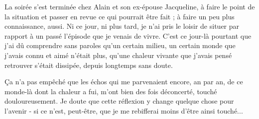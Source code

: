 La soirée s'est terminée chez Alain et son ex-épouse Jacqueline, à faire le point de la situation et passer en revue ce qui pourrait être fait ; à faire un peu plus connaissance, aussi. Ni ce jour, ni plus tard, je n'ai pris le loisir de situer par rapport à un passé l'épisode que je venais de vivre. C'est ce jour-là pourtant que j'ai dû comprendre sans paroles qu'un certain milieu, un certain monde que j'avais connu et aimé n'était plus, qu'une chaleur vivante que j'avais pensé retrouver s'était dissipée, depuis longtemps sans doute.

Ça n'a pas empêché que les échos qui me parvenaient encore, an par an, de ce monde-là dont la chaleur a fui, m'ont bien des fois déconcerté, touché douloureusement. Je doute que cette réflexion y change quelque chose pour l'avenir - si ce n'est, peut-être, que je me rebifferai moins d'être ainsi touché...







